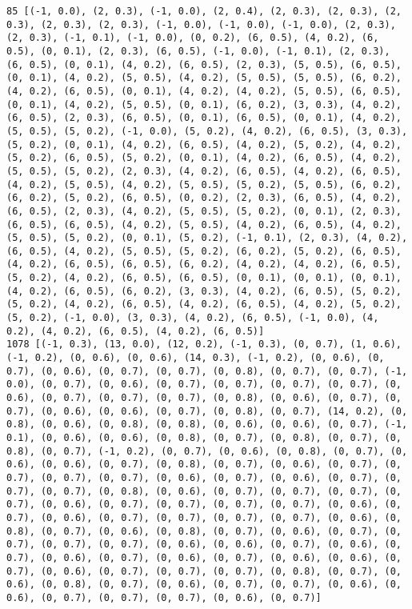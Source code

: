 \documentclass[11pt]{article}
\begin{document}
\begin{Verbatim}[commandchars=\\\{\}]
85 [(-1, 0.0), (2, 0.3), (-1, 0.0), (2, 0.4), (2, 0.3), (2, 0.3), (2, 0.3), (2, 0.3), (2, 0.3), (-1, 0.0), (-1, 0.0), (-1, 0.0), (2, 0.3), (2, 0.3), (-1, 0.1), (-1, 0.0), (0, 0.2), (6, 0.5), (4, 0.2), (6, 0.5), (0, 0.1), (2, 0.3), (6, 0.5), (-1, 0.0), (-1, 0.1), (2, 0.3), (6, 0.5), (0, 0.1), (4, 0.2), (6, 0.5), (2, 0.3), (5, 0.5), (6, 0.5), (0, 0.1), (4, 0.2), (5, 0.5), (4, 0.2), (5, 0.5), (5, 0.5), (6, 0.2), (4, 0.2), (6, 0.5), (0, 0.1), (4, 0.2), (4, 0.2), (5, 0.5), (6, 0.5), (0, 0.1), (4, 0.2), (5, 0.5), (0, 0.1), (6, 0.2), (3, 0.3), (4, 0.2), (6, 0.5), (2, 0.3), (6, 0.5), (0, 0.1), (6, 0.5), (0, 0.1), (4, 0.2), (5, 0.5), (5, 0.2), (-1, 0.0), (5, 0.2), (4, 0.2), (6, 0.5), (3, 0.3), (5, 0.2), (0, 0.1), (4, 0.2), (6, 0.5), (4, 0.2), (5, 0.2), (4, 0.2), (5, 0.2), (6, 0.5), (5, 0.2), (0, 0.1), (4, 0.2), (6, 0.5), (4, 0.2), (5, 0.5), (5, 0.2), (2, 0.3), (4, 0.2), (6, 0.5), (4, 0.2), (6, 0.5), (4, 0.2), (5, 0.5), (4, 0.2), (5, 0.5), (5, 0.2), (5, 0.5), (6, 0.2), (6, 0.2), (5, 0.2), (6, 0.5), (0, 0.2), (2, 0.3), (6, 0.5), (4, 0.2), (6, 0.5), (2, 0.3), (4, 0.2), (5, 0.5), (5, 0.2), (0, 0.1), (2, 0.3), (6, 0.5), (6, 0.5), (4, 0.2), (5, 0.5), (4, 0.2), (6, 0.5), (4, 0.2), (5, 0.5), (5, 0.2), (0, 0.1), (5, 0.2), (-1, 0.1), (2, 0.3), (4, 0.2), (6, 0.5), (4, 0.2), (5, 0.5), (5, 0.2), (6, 0.2), (5, 0.2), (6, 0.5), (4, 0.2), (6, 0.5), (6, 0.5), (6, 0.2), (4, 0.2), (4, 0.2), (6, 0.5), (5, 0.2), (4, 0.2), (6, 0.5), (6, 0.5), (0, 0.1), (0, 0.1), (0, 0.1), (4, 0.2), (6, 0.5), (6, 0.2), (3, 0.3), (4, 0.2), (6, 0.5), (5, 0.2), (5, 0.2), (4, 0.2), (6, 0.5), (4, 0.2), (6, 0.5), (4, 0.2), (5, 0.2), (5, 0.2), (-1, 0.0), (3, 0.3), (4, 0.2), (6, 0.5), (-1, 0.0), (4, 0.2), (4, 0.2), (6, 0.5), (4, 0.2), (6, 0.5)]
1078 [(-1, 0.3), (13, 0.0), (12, 0.2), (-1, 0.3), (0, 0.7), (1, 0.6), (-1, 0.2), (0, 0.6), (0, 0.6), (14, 0.3), (-1, 0.2), (0, 0.6), (0, 0.7), (0, 0.6), (0, 0.7), (0, 0.7), (0, 0.8), (0, 0.7), (0, 0.7), (-1, 0.0), (0, 0.7), (0, 0.6), (0, 0.7), (0, 0.7), (0, 0.7), (0, 0.7), (0, 0.6), (0, 0.7), (0, 0.7), (0, 0.7), (0, 0.8), (0, 0.6), (0, 0.7), (0, 0.7), (0, 0.6), (0, 0.6), (0, 0.7), (0, 0.8), (0, 0.7), (14, 0.2), (0, 0.8), (0, 0.6), (0, 0.8), (0, 0.8), (0, 0.6), (0, 0.6), (0, 0.7), (-1, 0.1), (0, 0.6), (0, 0.6), (0, 0.8), (0, 0.7), (0, 0.8), (0, 0.7), (0, 0.8), (0, 0.7), (-1, 0.2), (0, 0.7), (0, 0.6), (0, 0.8), (0, 0.7), (0, 0.6), (0, 0.6), (0, 0.7), (0, 0.8), (0, 0.7), (0, 0.6), (0, 0.7), (0, 0.7), (0, 0.7), (0, 0.7), (0, 0.6), (0, 0.7), (0, 0.6), (0, 0.7), (0, 0.7), (0, 0.7), (0, 0.8), (0, 0.6), (0, 0.7), (0, 0.7), (0, 0.7), (0, 0.7), (0, 0.6), (0, 0.7), (0, 0.7), (0, 0.7), (0, 0.7), (0, 0.6), (0, 0.7), (0, 0.6), (0, 0.7), (0, 0.7), (0, 0.7), (0, 0.7), (0, 0.6), (0, 0.8), (0, 0.7), (0, 0.6), (0, 0.8), (0, 0.7), (0, 0.6), (0, 0.7), (0, 0.7), (0, 0.7), (0, 0.7), (0, 0.6), (0, 0.6), (0, 0.7), (0, 0.6), (0, 0.7), (0, 0.6), (0, 0.7), (0, 0.6), (0, 0.7), (0, 0.6), (0, 0.6), (0, 0.7), (0, 0.6), (0, 0.7), (0, 0.7), (0, 0.7), (0, 0.8), (0, 0.7), (0, 0.6), (0, 0.8), (0, 0.7), (0, 0.6), (0, 0.7), (0, 0.7), (0, 0.6), (0, 0.6), (0, 0.7), (0, 0.7), (0, 0.7), (0, 0.6), (0, 0.7)]

\end{Verbatim}
\end{document}
